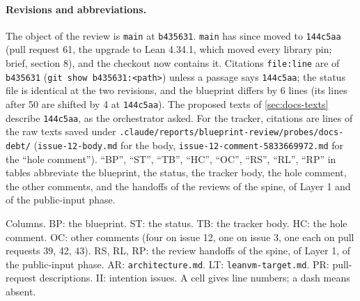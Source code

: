 \label{sec:docs-inventory}

\paragraph{Revisions and abbreviations.} The object of the review is \texttt{main} at \texttt{b435631}. \texttt{main} has since moved to \texttt{144c5aa} (pull request 61, the upgrade to Lean 4.34.1, which moved every library pin; brief, section 8), and the checkout now contains it. Citations \texttt{file:\allowbreak{}line} are of \texttt{b435631} (\texttt{git show b435631:\allowbreak{}<path>}) unless a passage says \texttt{144c5aa}; the status file is identical at the two revisions, and the blueprint differs by 6 lines (its lines after 50 are shifted by 4 at \texttt{144c5aa}). The proposed texts of \cref{sec:docs-texts} describe \texttt{144c5aa}, as the orchestrator asked. For the tracker, citations are lines of the raw texts saved under \texttt{.\allowbreak{}claude/\allowbreak{}reports/\allowbreak{}blueprint-\allowbreak{}review/\allowbreak{}probes/\allowbreak{}docs-\allowbreak{}debt/\allowbreak{}} (\texttt{issue-\allowbreak{}12-\allowbreak{}body.\allowbreak{}md} for the body, \texttt{issue-\allowbreak{}12-\allowbreak{}comment-\allowbreak{}5833669972.\allowbreak{}md} for the ``hole comment''). ``BP'', ``ST'', ``TB'', ``HC'', ``OC'', ``RS'', ``RL'', ``RP'' in tables abbreviate the blueprint, the status, the tracker body, the hole comment, the other comments, and the handoffs of the reviews of the spine, of Layer 1 and of the public-input phase.

\begin{sloppypar}
Columns. BP: the blueprint. ST: the status. TB: the tracker body. HC: the hole comment. OC: other comments (four on issue 12, one on issue 3, one each on pull requests 39, 42, 43). RS, RL, RP: the review handoffs of the spine, of Layer 1, of the public-input phase. AR: \texttt{architecture.\allowbreak{}md}. LT: \texttt{leanvm-\allowbreak{}target.\allowbreak{}md}. PR: pull-request descriptions. II: intention issues. A cell gives line numbers; a dash means absent.
\end{sloppypar}

